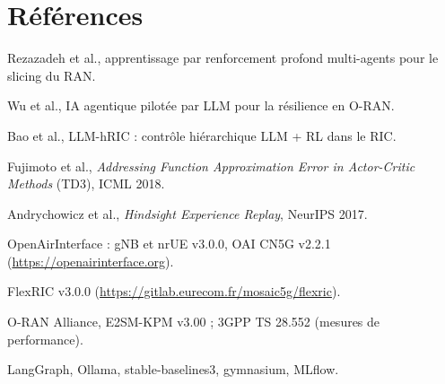 \documentclass[11pt,a4paper]{article}
\begin{document}
\section*{Références}
\small
\begin{enumerate}[label={[\arabic*]}]
  \item Rezazadeh et al., apprentissage par renforcement profond multi-agents pour le slicing du RAN.
  \item Wu et al., IA agentique pilotée par LLM pour la résilience en O-RAN.
  \item Bao et al., LLM-hRIC : contrôle hiérarchique LLM + RL dans le RIC.
  \item Fujimoto et al., \emph{Addressing Function Approximation Error in Actor-Critic Methods} (TD3), ICML 2018.
  \item Andrychowicz et al., \emph{Hindsight Experience Replay}, NeurIPS 2017.
  \item OpenAirInterface : gNB et nrUE v3.0.0, OAI CN5G v2.2.1 (\url{https://openairinterface.org}).
  \item FlexRIC v3.0.0 (\url{https://gitlab.eurecom.fr/mosaic5g/flexric}).
  \item O-RAN Alliance, E2SM-KPM v3.00 ; 3GPP TS 28.552 (mesures de performance).
  \item LangGraph, Ollama, stable-baselines3, gymnasium, MLflow.
\end{enumerate}
\end{document}
